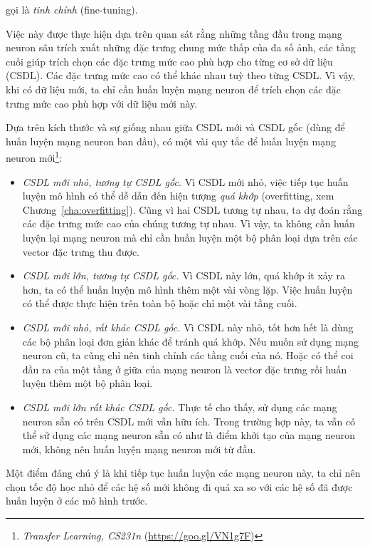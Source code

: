 gọi là \textit{tinh chỉnh} ({fine-tuning}). {Việc này được thực hiện dựa trên quan
sát rằng những tầng đầu trong mạng neuron sâu trích xuất những đặc trưng chung mức thấp của đa số ảnh, các tầng cuối giúp trích chọn các đặc trưng mức cao phù hợp cho từng cơ sở dữ liệu (CSDL). Các đặc trưng mức cao có thể khác nhau tuỳ theo từng CSDL. Vì vậy, khi có dữ liệu mới, ta chỉ cần huấn luyện mạng neuron để trích chọn các đặc trưng mức cao phù hợp với dữ liệu mới này. 
 
Dựa trên kích thước và sự giống nhau giữa CSDL mới và CSDL gốc (dùng để huấn luyện mạng neuron ban đầu), có một vài quy tắc để huấn luyện mạng neuron mới\footnote{\textit{Transfer Learning, CS231n} (\url{https://goo.gl/VN1g7F})}: 

\begin{itemize}
\item \textit{CSDL mới nhỏ, tương tự CSDL gốc.} Vì CSDL mới nhỏ, việc
tiếp tục huấn luyện mô hình có thể dễ dẫn đến hiện tượng \textit{quá khớp} (overfitting, xem Chương~\ref{cha:overfitting}). Cũng vì hai CSDL tương tự nhau, ta dự đoán
rằng các đặc trưng mức cao của chúng tương tự nhau. Vì vậy, ta không cần
huấn luyện lại mạng neuron mà chỉ cần huấn luyện một bộ phân loại dựa trên các vector đặc trưng thu được. 
 
\item \textit{CSDL mới lớn, tương tự CSDL gốc.} Vì CSDL này lớn,
quá khớp ít xảy ra hơn, ta có thể huấn luyện mô hình thêm một
vài vòng lặp. Việc huấn luyện có thể được thực hiện trên toàn bộ hoặc chỉ một
vài tầng cuối.
 
\item \textit{CSDL mới nhỏ, rất khác CSDL gốc.} Vì CSDL này nhỏ, tốt
hơn hết là dùng các bộ phân loại đơn giản khác để tránh quá khớp. Nếu muốn sử
dụng mạng neuron cũ, ta cũng chỉ nên tinh chỉnh các tầng cuối của nó. Hoặc có thể coi đầu ra của một tầng ở giữa của mạng neuron là vector đặc
trưng rồi huấn luyện thêm một bộ phân loại.
 
\item \textit{CSDL mới lớn rất khác CSDL gốc.} Thực tế cho thấy, sử dụng
các mạng neuron sẵn có trên CSDL mới vẫn hữu ích. Trong trường hợp này, ta vẫn có
thể sử dụng các mạng neuron sẵn có như là điểm khởi tạo của mạng neuron mới, không nên
huấn luyện mạng neuron mới từ đầu.
\end{itemize}
 
Một điểm đáng chú ý là khi tiếp tục huấn luyện các mạng neuron này, ta chỉ
nên chọn tốc độ học nhỏ để các hệ số mới không đi quá xa so với các
hệ số đã được huấn luyện ở các mô hình trước.
 
}
